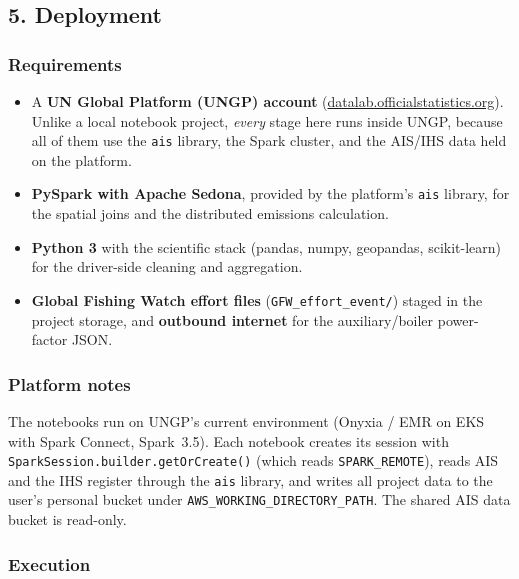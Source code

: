 \documentclass[
  11pt,
]{article}
\providecommand{\tightlist}{%
  \setlength{\itemsep}{0pt}\setlength{\parskip}{0pt}}
\begin{document}
\subsection{5. Deployment}\label{deployment}

\subsubsection{Requirements}\label{requirements}

\begin{itemize}
\tightlist
\item
  A \textbf{UN Global Platform (UNGP) account}
  (\href{https://datalab.officialstatistics.org}{datalab.officialstatistics.org}).
  Unlike a local notebook project, \emph{every} stage here runs inside
  UNGP, because all of them use the \texttt{ais} library, the Spark
  cluster, and the AIS/IHS data held on the platform.
\item
  \textbf{PySpark with Apache Sedona}, provided by the platform's
  \texttt{ais} library, for the spatial joins and the distributed
  emissions calculation.
\item
  \textbf{Python 3} with the scientific stack (pandas, numpy, geopandas,
  scikit-learn) for the driver-side cleaning and aggregation.
\item
  \textbf{Global Fishing Watch effort files}
  (\texttt{GFW\_effort\_event/}) staged in the project storage, and
  \textbf{outbound internet} for the auxiliary/boiler power-factor JSON.
\end{itemize}

\subsubsection{Platform notes}\label{platform-notes}

The notebooks run on UNGP's current environment (Onyxia / EMR on EKS with
Spark Connect, Spark~3.5). Each notebook creates its session with
\texttt{SparkSession.builder.getOrCreate()} (which reads
\texttt{SPARK\_REMOTE}), reads AIS and the IHS register through the
\texttt{ais} library, and writes all project data to the user's personal
bucket under \texttt{AWS\_WORKING\_DIRECTORY\_PATH}. The shared AIS data
bucket is read-only.

\subsubsection{Execution}\label{execution}
\end{document}
